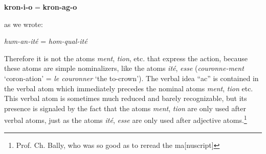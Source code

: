 \begin{sloppypar}
{    \begin{center}
      \textbf{kron-i-o} = \textbf{kron-ag-o}
    \end{center}

    \noindent as we wrote:

    \begin{center}
      \emph{hum-an-ité} = \emph{hom-qual-ité}
    \end{center}

    Therefore it is not the atoms \emph{ment}, \emph{tion}, etc. that
    express the action, because these atoms are simple nominalizers,
    like the atoms \emph{ité}, \emph{esse} (\emph{couronne-ment}
    `coron-ation' = \emph{le couronner} `the to-crown'). The verbal
    idea ``ac'' is contained in the verbal atom which immediately
    precedes the nominal atoms \emph{ment}, \emph{tion} etc. This
    verbal atom is sometimes much reduced and barely recognizable, but
    its presence is signaled by the fact that the atoms \emph{ment},
    \emph{tion} are only used after verbal atoms, just as the atoms
    \emph{ité}, \emph{esse} are only used after adjective
    atoms.\footnote{Prof. Ch. Bally, who was so good as to reread the
      ma[nuscript]}}


\end{sloppypar}
